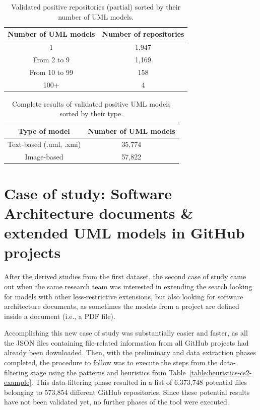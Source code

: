 \documentclass[a4paper, 12pt]{book}
\begin{document}
 \begin{table}[]
   \centering
   \caption{Validated positive repositories (partial) sorted by their number of UML models.}
   \label{table:validated-repos-table}
   \begin{tabular}{|c|c|}
   \hline
   \textbf{Number of UML models} & \textbf{Number of repositories}     \\ \hline
   1                             & 1,947                               \\
   From 2 to 9                   & 1,169                               \\
   From 10 to 99                 & 158                                 \\
   100+                          & 4                                   \\ \hline
   \end{tabular}
 \end{table}
 \begin{table}[]
   \centering
   \caption{Complete results of validated positive UML models sorted by their type.}
   \label{table:validated-models-table}
   \begin{tabular}{|c|c|}
   \hline
   \textbf{Type of model}     & \textbf{Number of UML models}     \\ \hline
   Text-based (.uml, .xmi)    & 35,774                            \\
   Image-based                & 57,822                            \\ \hline
   \end{tabular}
 \end{table}
\section{Case of study: Software Architecture documents \& extended UML models in GitHub projects}
\label{sec:case-study-sad}

After the derived studies from the first dataset, the second case of study came out when the same research team was
interested in extending the search looking for models with other less-restrictive extensions, but also looking for
software architecture documents, as sometimes the models from a project are defined inside a document (i.e., a PDF file).

Accomplishing this new case of study was substantially easier and faster, as all the JSON files containing file-related information
from all GitHub projects had already been downloaded. Then, with the preliminary and data extraction phases completed, the procedure to
follow was to execute the steps from the data-filtering stage using the patterns and heuristics from Table~\ref{table:heuristics-cs2-example}.
This data-filtering phase resulted in a list of 6,373,748 potential files belonging to 573,854 different GitHub repositories.
Since these potential results have not been validated yet, no further phases of the tool were executed.
\end{document}
